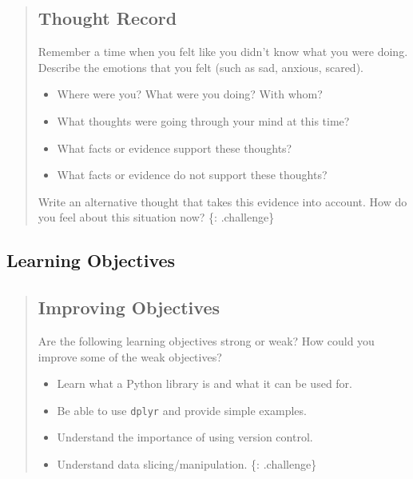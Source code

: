 \begin{quote}
\subsection{Thought Record}\label{thought-record}

Remember a time when you felt like you didn't know what you were doing.
Describe the emotions that you felt (such as sad, anxious, scared).

\begin{itemize}
\itemsep1pt\parskip0pt
\item
  Where were you? What were you doing? With whom?
\item
  What thoughts were going through your mind at this time?
\item
  What facts or evidence support these thoughts?
\item
  What facts or evidence do not support these thoughts?
\end{itemize}

Write an alternative thought that takes this evidence into account. How
do you feel about this situation now? \{: .challenge\}
\end{quote}

\subsection{Learning Objectives}\label{learning-objectives}

\begin{quote}
\subsection{Improving Objectives}\label{improving-objectives}

Are the following learning objectives strong or weak? How could you
improve some of the weak objectives?

\begin{itemize}
\itemsep1pt\parskip0pt
\item
  Learn what a Python library is and what it can be used for.
\item
  Be able to use \texttt{dplyr} and provide simple examples.
\item
  Understand the importance of using version control.
\item
  Understand data slicing/manipulation. \{: .challenge\}
\end{itemize}
\end{quote}

